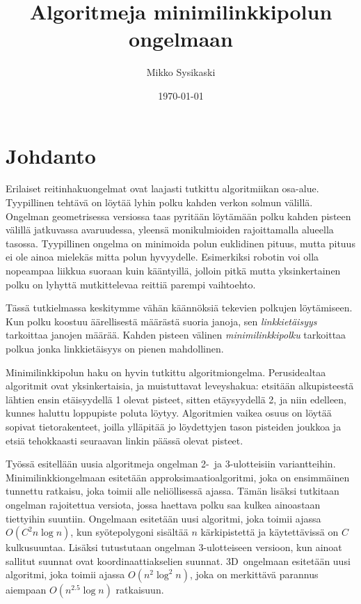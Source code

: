 \documentclass[finnish]{tktltiki2}
\title{Algoritmeja minimilinkkipolun ongelmaan}
\author{Mikko Sysikaski}
\date{\today}
\theoremstyle{definition}
\theoremstyle{remark}
\begin{document}
\frontmatter      %

\maketitle        %
\makeabstract     %

\tableofcontents  %

\mainmatter       %



\section{Johdanto}

Erilaiset reitinhakuongelmat ovat laajasti tutkittu algoritmiikan osa-alue.\cite{survey}
Tyypillinen tehtävä on löytää lyhin polku kahden verkon solmun välillä.
Ongelman geometrisessa versiossa taas pyritään löytämään polku kahden pisteen välillä jatkuvassa avaruudessa, yleensä monikulmioiden rajoittamalla alueella tasossa.
Tyypillinen ongelma on minimoida polun euklidinen pituus, mutta pituus ei ole ainoa mielekäs mitta polun hyvyydelle.
Esimerkiksi robotin voi olla nopeampaa liikkua suoraan kuin kääntyillä, jolloin pitkä mutta yksinkertainen polku on lyhyttä mutkittelevaa reittiä parempi vaihtoehto.

Tässä tutkielmassa keskitymme vähän käännöksiä tekevien polkujen löytämiseen.
Kun polku koostuu äärellisestä määrästä suoria janoja, sen \textit{linkkietäisyys} tarkoittaa janojen määrää.
Kahden pisteen välinen \textit{minimilinkkipolku} tarkoittaa polkua jonka linkkietäisyys on pienen mahdollinen.

Minimilinkkipolun haku on hyvin tutkittu algoritmiongelma.
Perusidealtaa algoritmit ovat yksinkertaisia, ja muistuttavat leveyshakua: etsitään alkupisteestä lähtien ensin etäisyydellä 1 olevat pisteet, sitten etäysyydellä 2, ja niin edelleen, kunnes haluttu loppupiste poluta löytyy.
Algoritmien vaikea osuus on löytää sopivat tietorakenteet, joilla ylläpitää jo löydettyjen tason pisteiden joukkoa ja etsiä tehokkaasti seuraavan linkin päässä olevat pisteet.

Työssä esitellään uusia algoritmeja ongelman 2-~ja 3-ulotteisiin variantteihin.
Minimilinkkiongelmaan esitetään approksimaatioalgoritmi, joka on ensimmäinen tunnettu ratkaisu, joka toimii alle neliöllisessä ajassa\cite{revisited}.
Tämän lisäksi tutkitaan ongelman rajoitettua versiota, jossa haettava polku saa kulkea ainoastaan tiettyihin suuntiin.
Ongelmaan esitetään uusi algoritmi, joka toimii ajassa $O(C^2n\log n)$, kun syötepolygoni sisältää $n$ kärkipistettä ja käytettävissä on $C$ kulkusuuntaa\cite{revisited}.
Lisäksi tutustutaan ongelman 3-ulotteiseen versioon, kun ainoat sallitut suunnat ovat koordinaattiakselien suunnat.
3D~ongelmaan esitetään uusi algoritmi, joka toimii ajassa $O(n^2\log^2n)$, joka on merkittävä parannus aiempaan $O(n^{2.5}\log n)$ ratkaisuun\cite{restricted}.
\end{document}
